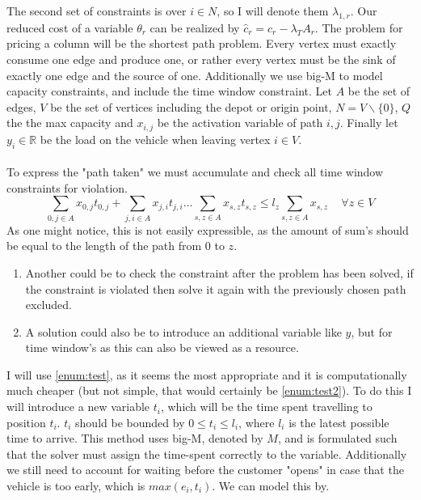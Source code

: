 \documentclass{article}
\begin{document}
    The second set of constraints is over $i \in N$, so I will denote them $\lambda_{1, r}$.
    Our reduced cost of a variable $\theta_r$ can be realized by $\hat{c}_r = c_r - \lambda_T A_r$.
    The problem for pricing a column will be the shortest path problem.
    Every vertex must exactly consume one edge and produce one, or rather every vertex must be the sink of exactly one edge and the source of one.
    Additionally we use big-M to model capacity constraints, and include the time window constraint.
    Let $A$ be the set of edges, $V$ be the set of vertices including the depot or origin point, $N = V \backslash \{ 0 \}$, $Q$ the the max capacity and $x_{i,j}$ be the activation variable of path $i,j$.
    Finally let $y_i \in \mathbb{R}$ be the load on the vehicle when leaving vertex $i \in V$.\\\\
    To express the "path taken" we must accumulate and check all time window constraints for violation.
    \[
        \sum_{0, j \in A} x_{0, j} t_{0, j} + \sum_{j, i \in A} x_{j, i} t_{j, i} \dots \sum_{s, z \in A} x_{s, z} t_{s, z} \leq l_z \sum_{s, z \in A} x_{s, z} \,\,\,\,\,\,\, \forall z \in V
    \]
    As one might notice, this is not easily expressible, as the amount of sum's should be equal to the length of the path from $0$ to $z$.
    \begin{enumerate}
        \item\label{enum:test2} Another could be to check the constraint after the problem has been solved, if the constraint is violated then solve it again with the previously chosen path excluded.
        \item\label{enum:test} A solution could also be to introduce an additional variable like $y$, but for time window's as this can also be viewed as a resource.
    \end{enumerate}
    I will use \autoref{enum:test}, as it seems the most appropriate and it is computationally much cheaper (but not simple, that would certainly be \autoref{enum:test2}).
    To do this I will introduce a new variable $t_i$, which will be the time spent travelling to position $t_i$.
    $t_i$ should be bounded by $0 \leq t_i \leq l_i$, where $l_i$ is the latest possible time to arrive.
    This method uses big-M, denoted by $M$, and is formulated such that the solver must assign the time-spent correctly to the variable.
    Additionally we still need to account for waiting before the customer "opens" in case that the vehicle is too early, which is $max(e_i, t_i)$.
    We can model this by.
\end{document}
